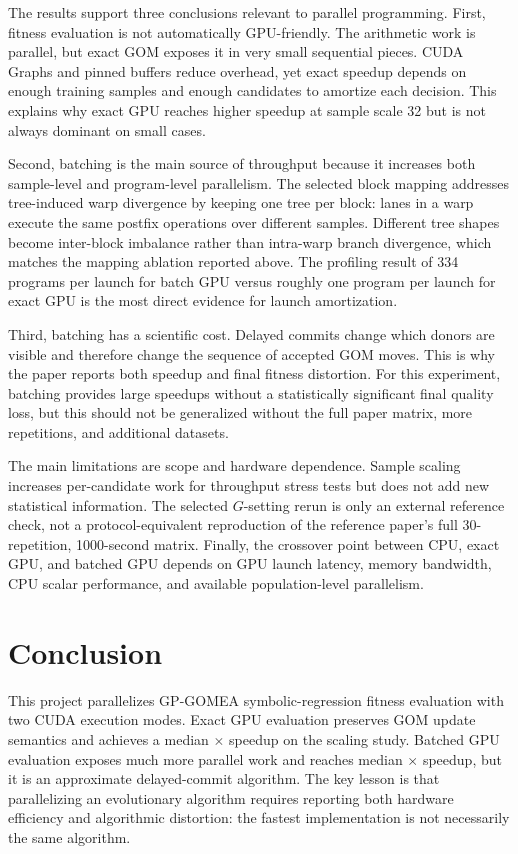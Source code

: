 \documentclass[conference]{IEEEtran}
\newcommand{\gpgomea}{GP-GOMEA\xspace}
\newcommand{\mainbodyendpage}{?}
\begin{document}
The results support three conclusions relevant to parallel programming. First,
fitness evaluation is not automatically GPU-friendly. The arithmetic work is
parallel, but exact GOM exposes it in very small sequential pieces. CUDA Graphs
and pinned buffers reduce overhead, yet exact speedup depends on enough training
samples and enough candidates to amortize each decision. This explains why exact
GPU reaches higher speedup at sample scale 32 but is not always dominant on
small cases.

Second, batching is the main source of throughput because it increases both
sample-level and program-level parallelism. The selected block mapping addresses
tree-induced warp divergence by keeping one tree per block: lanes in a warp
execute the same postfix operations over different samples. Different tree
shapes become inter-block imbalance rather than intra-warp branch divergence,
which matches the mapping ablation reported above. The profiling result of 334
programs per launch for batch GPU versus roughly one program per launch for
exact GPU is the most direct evidence for launch amortization.

Third, batching has a scientific cost. Delayed commits change which donors are
visible and therefore change the sequence of accepted GOM moves. This is why the
paper reports both speedup and final fitness distortion. For this experiment,
batching provides large speedups without a statistically significant final
quality loss, but this should not be generalized without the full paper matrix,
more repetitions, and additional datasets.

The main limitations are scope and hardware dependence. Sample scaling increases
per-candidate work for throughput stress tests but does not add new statistical
information. The selected \(G\)-setting rerun is only an external reference
check, not a protocol-equivalent reproduction of the reference paper's full
30-repetition, 1000-second matrix. Finally, the crossover point between CPU,
exact GPU, and batched GPU depends on GPU launch latency, memory bandwidth, CPU
scalar performance, and available population-level parallelism.

\section{Conclusion}

This project parallelizes \gpgomea symbolic-regression fitness evaluation with
two CUDA execution modes. Exact GPU evaluation preserves GOM update semantics and
achieves a median \ExactMedianSpeedup$\times$ speedup on the scaling study.
Batched GPU evaluation exposes much more parallel work and reaches median
\BestBatchMedianSpeedup$\times$ speedup, but it is an approximate delayed-commit
algorithm. The key lesson is that parallelizing an evolutionary algorithm
requires reporting both hardware efficiency and algorithmic distortion: the
fastest implementation is not necessarily the same algorithm.




\xdef\mainbodyendpage{\thepage}
\end{document}
